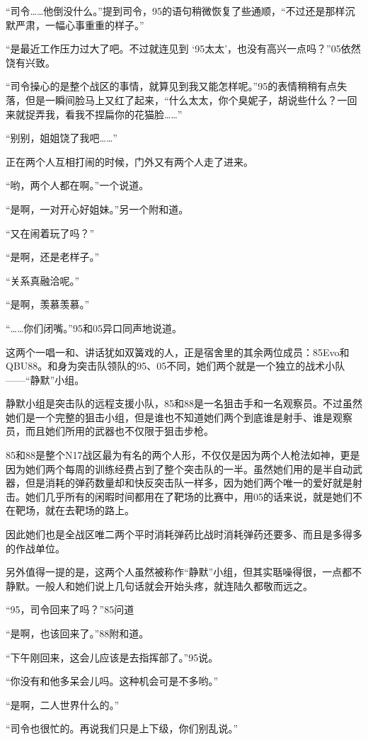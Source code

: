 “司令……他倒没什么。”提到司令，95的语句稍微恢复了些通顺，“不过还是那样沉默严肃，一幅心事重重的样子。”

“是最近工作压力过大了吧。不过就连见到 ‘95太太’，也没有高兴一点吗？”05依然饶有兴致。

“司令操心的是整个战区的事情，就算见到我又能怎样呢。”95的表情稍稍有点失落，但是一瞬间脸马上又红了起来，“什么太太，你个臭妮子，胡说些什么？一回来就捉弄我，看我不捏扁你的花猫脸……”

“别别，姐姐饶了我吧……”

正在两个人互相打闹的时候，门外又有两个人走了进来。

“哟，两个人都在啊。”一个说道。

“是啊，一对开心好姐妹。”另一个附和道。

“又在闹着玩了吗？”

“是啊，还是老样子。”

“关系真融洽呢。”

“是啊，羡慕羡慕。”

“……你们闭嘴。”95和05异口同声地说道。

这两个一唱一和、讲话犹如双簧戏的人，正是宿舍里的其余两位成员：85Evo和QBU88。和身为突击队领队的95、05不同，她们两个就是一个独立的战术小队——“静默”小组。

静默小组是突击队的远程支援小队，85和88是一名狙击手和一名观察员。不过虽然她们是一个完整的狙击小组，但是谁也不知道她们两个到底谁是射手、谁是观察员，而且她们所用的武器也不仅限于狙击步枪。

85和88是整个N17战区最为有名的两个人形，不仅仅是因为两个人枪法如神，更是因为她们两个每周的训练经费占到了整个突击队的一半。虽然她们用的是半自动武器，但是消耗的弹药数量却和快反突击队一样多，因为她们两个唯一的爱好就是射击。她们几乎所有的闲暇时间都用在了靶场的比赛中，用05的话来说，就是她们不在靶场，就在去靶场的路上。

因此她们也是全战区唯二两个平时消耗弹药比战时消耗弹药还要多、而且是多得多的作战单位。

另外值得一提的是，这两个人虽然被称作“静默”小组，但其实聒噪得很，一点都不静默。一般人和她们说上几句话就会开始头疼，就连陆久都敬而远之。

“95，司令回来了吗？”85问道

“是啊，也该回来了。”88附和道。

“下午刚回来，这会儿应该是去指挥部了。”95说。

“你没有和他多呆会儿吗。这种机会可是不多哟。”

“是啊，二人世界什么的。”

“司令也很忙的。再说我们只是上下级，你们别乱说。”

